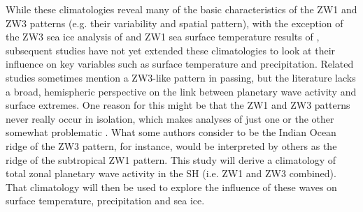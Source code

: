 While these climatologies reveal many of the basic characteristics of the ZW1 and ZW3 patterns (e.g. their variability and spatial pattern), with the exception of the ZW3 sea ice analysis of \citet{Raphael2007} and ZW1 sea surface temperature results of \citet{Hobbs2007}, subsequent studies have not yet extended these climatologies to look at their influence on key variables such as surface temperature and precipitation. Related studies \citep[e.g. of Australian rainfall variability;][]{Frederiksen2014} sometimes mention a ZW3-like pattern in passing, but the literature lacks a broad, hemispheric perspective on the link between planetary wave activity and surface extremes. One reason for this might be that the ZW1 and ZW3 patterns never really occur in isolation, which makes analyses of just one or the other somewhat problematic \citep{Hobbs2010}. What some authors consider to be the Indian Ocean ridge of the ZW3 pattern, for instance, would be interpreted by others \citep[e.g.][]{Hobbs2007} as the ridge of the subtropical ZW1 pattern. This study will derive a climatology of total zonal planetary wave activity in the SH (i.e. ZW1 and ZW3 combined). That climatology will then be used to explore the influence of these waves on surface temperature, precipitation and sea ice.

